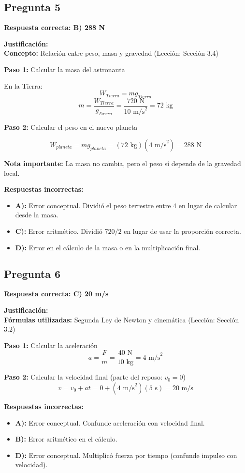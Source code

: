 \newpage
\begin{respuestabox}
\subsection{Pregunta 5}
\textcolor{verdecorrecto}{\textbf{Respuesta correcta: B) 288 N}}

\textbf{Justificación:}\\
\textbf{Concepto:} Relación entre peso, masa y gravedad (Lección: Sección 3.4)

\textbf{Paso 1:} Calcular la masa del astronauta

En la Tierra:
$$W_{Tierra} = mg_{Tierra}$$
$$m = \frac{W_{Tierra}}{g_{Tierra}} = \frac{720 \text{ N}}{10 \text{ m/s}^2} = 72 \text{ kg}$$

\textbf{Paso 2:} Calcular el peso en el nuevo planeta

$$W_{planeta} = mg_{planeta} = (72 \text{ kg})(4 \text{ m/s}^2) = 288 \text{ N}$$

\textbf{Nota importante:} La masa no cambia, pero el peso sí depende de la gravedad local.

\textbf{Respuestas incorrectas:}
\begin{itemize}
    \item \textbf{A):} Error conceptual. Dividió el peso terrestre entre 4 en lugar de calcular desde la masa.
    \item \textbf{C):} Error aritmético. Dividió $720/2$ en lugar de usar la proporción correcta.
    \item \textbf{D):} Error en el cálculo de la masa o en la multiplicación final.
\end{itemize}
\end{respuestabox}

\begin{respuestabox}
\subsection{Pregunta 6}
\textcolor{verdecorrecto}{\textbf{Respuesta correcta: C) 20 m/s}}

\textbf{Justificación:}\\
\textbf{Fórmulas utilizadas:} Segunda Ley de Newton y cinemática (Lección: Sección 3.2)

\textbf{Paso 1:} Calcular la aceleración
$$a = \frac{F}{m} = \frac{40 \text{ N}}{10 \text{ kg}} = 4 \text{ m/s}^2$$

\textbf{Paso 2:} Calcular la velocidad final (parte del reposo: $v_0 = 0$)
$$v = v_0 + at = 0 + (4 \text{ m/s}^2)(5 \text{ s}) = 20 \text{ m/s}$$

\textbf{Respuestas incorrectas:}
\begin{itemize}
    \item \textbf{A):} Error conceptual. Confunde aceleración con velocidad final.
    \item \textbf{B):} Error aritmético en el cálculo.
    \item \textbf{D):} Error conceptual. Multiplicó fuerza por tiempo (confunde impulso con velocidad).
\end{itemize}
\end{respuestabox}

